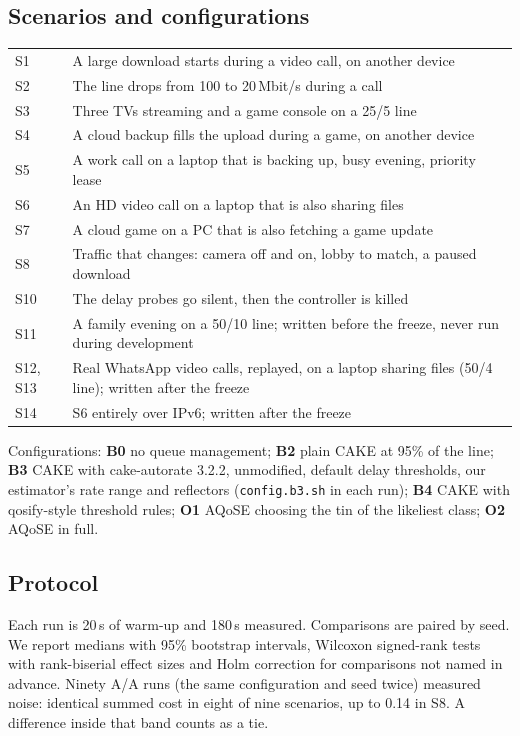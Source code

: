 \documentclass[11pt,a4paper]{article}
\begin{document}
\subsection{Scenarios and configurations}
\begin{table}[H]\centering\small
\begin{tabularx}{\linewidth}{@{}l>{\raggedright\arraybackslash}X@{}}
\toprule
S1 & A large download starts during a video call, on another device \\
S2 & The line drops from 100 to 20\,Mbit/s during a call \\
S3 & Three TVs streaming and a game console on a 25/5 line \\
S4 & A cloud backup fills the upload during a game, on another device \\
S5 & A work call on a laptop that is backing up, busy evening, priority lease \\
S6 & An HD video call on a laptop that is also sharing files \\
S7 & A cloud game on a PC that is also fetching a game update \\
S8 & Traffic that changes: camera off and on, lobby to match, a paused download \\
S10 & The delay probes go silent, then the controller is killed \\
S11 & A family evening on a 50/10 line; written before the freeze, never run during development \\
S12, S13 & Real WhatsApp video calls, replayed, on a laptop sharing files (50/4 line); written after the freeze \\
S14 & S6 entirely over IPv6; written after the freeze \\
\bottomrule
\end{tabularx}
\end{table}

Configurations: \textbf{B0} no queue management; \textbf{B2} plain CAKE at 95\% of the line; \textbf{B3} CAKE with cake-autorate 3.2.2, unmodified, default delay thresholds, our estimator's rate range and reflectors (\texttt{config.b3.sh} in each run); \textbf{B4} CAKE with qosify-style threshold rules; \textbf{O1} AQoSE choosing the tin of the likeliest class; \textbf{O2} AQoSE in full.

\subsection{Protocol}
Each run is 20\,s of warm-up and 180\,s measured. Comparisons are paired by seed. We report medians with 95\% bootstrap intervals, Wilcoxon signed-rank tests with rank-biserial effect sizes and Holm correction for comparisons not named in advance. Ninety A/A runs (the same configuration and seed twice) measured noise: identical summed cost in eight of nine scenarios, up to 0.14 in S8. A difference inside that band counts as a tie.
\end{document}
